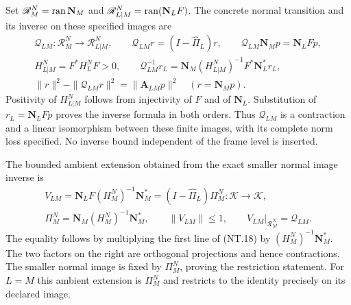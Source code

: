 Set $\mathscr R_M^N=\operatorname{ran}\mathbf N_M$ and
$\mathscr R_{L|M}^N=\operatorname{ran}(\mathbf N_LF)$. The concrete normal
transition and its inverse on these specified images are
\[
 \begin{gathered}
 \mathcal Q_{LM}:\mathscr R_M^N\longrightarrow\mathscr R_{L|M}^N,
 \qquad \mathcal Q_{LM}r=(I-\widehat\Pi_L)r,\qquad
 \mathcal Q_{LM}\mathbf N_Mp=\mathbf N_LFp,\\
 H_{L|M}^N=F^*H_L^NF>0,\qquad
 \mathcal Q_{LM}^{-1}r_L
      =\mathbf N_M(H_{L|M}^N)^{-1}F^*\mathbf N_L^*r_L,\\
 \|r\|^2-\|\mathcal Q_{LM}r\|^2
       =\|\mathbf A_{LM}p\|^2\quad(r=\mathbf N_Mp).
 \end{gathered}
 \tag{NT.18}
\]
Positivity of $H_{L|M}^N$ follows from injectivity of $F$ and
of $\mathbf N_L$. Substitution of $r_L=\mathbf N_LFp$
proves the inverse formula in both orders. Thus $\mathcal Q_{LM}$
is a contraction and a linear isomorphism between these finite
images, with its complete norm loss specified. No inverse bound
independent of the frame level is inserted.

The bounded ambient extension obtained from the exact smaller normal
image inverse is
\[
 \begin{gathered}
 V_{LM}=\mathbf N_LF(H_M^N)^{-1}\mathbf N_M^*
       =(I-\widehat\Pi_L)\Pi_M^N:\mathscr K\to\mathscr K,\\
 \Pi_M^N=\mathbf N_M(H_M^N)^{-1}\mathbf N_M^*,\qquad
 \|V_{LM}\|\le1,\qquad
 V_{LM}|_{\mathscr R_M^N}=\mathcal Q_{LM}.
 \end{gathered}
 \tag{NT.18a}
\]
The equality follows by multiplying the first line of (NT.18) by
$(H_M^N)^{-1}\mathbf N_M^*$. The two factors on the right are
orthogonal projections and hence contractions. The smaller normal
image is fixed by $\Pi_M^N$, proving the restriction statement.
For $L=M$ this ambient extension is $\Pi_M^N$ and restricts
to the identity precisely on its declared image.

